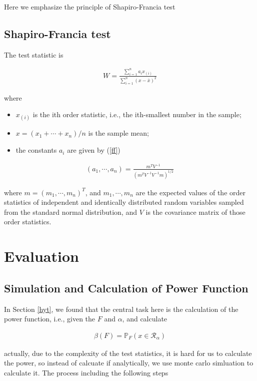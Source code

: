 \documentclass[twoside]{article}
\begin{document}
Here we emphasize the principle of Shapiro-Francia test

\subsection{Shapiro-Francia test}

The test statistic is

\begin{eqnarray}
  W=\frac{\sum_{i=1}^n{a_ix_{(i)}}}{\sum_{i=1}^n{(x-\bar{x})^2}}
\end{eqnarray}

where

\begin{itemize}
  \item $x_{{(i)}}$ is the ith order statistic, i.e., the ith-smallest number in the sample;
  \item ${x}=(x_{1}+\cdots +x_{n})/n$ is the sample mean;
  \item the constants $a_{i}$ are given by (\ref{ff})
\end{itemize}

\begin{eqnarray}
\label{ff}
 (a_{1},\cdots,a_{n})=\frac{m^{T}V^{-1}}{(m^{T}V^{-1}V^{-1}m)^{1/2}}
\end{eqnarray}

where $m=(m_1,\cdots,m_n)^T$, and $m_1,\cdots,m_n$ are the expected values of the order statistics of independent and identically distributed random variables sampled from the standard normal distribution, and $V$ is the covariance matrix of those order statistics.

\section{Evaluation}

\subsection{Simulation and Calculation of Power Function}

In Section \ref{hyt}, we found that the central task here is the calculation of the power function, i.e., given the $F$ and $\alpha$, and calculate

\begin{eqnarray}
  \beta(F) = \mathbb{P}_F(x \in \mathscr{R}_\alpha)
\end{eqnarray}

actually, due to the complexity of the test statistics, it is hard for us to calculate the power, so instead of calcuate if analytically, we use monte carlo simluation to calculate it. The process including the following steps
\end{document}
